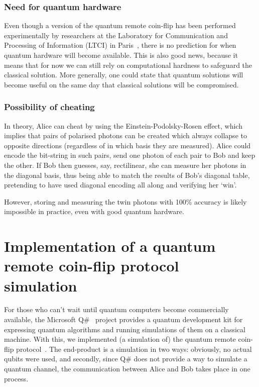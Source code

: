 \documentclass[oneside,a4paper]{article}
\begin{document}
\subsubsection{Need for quantum hardware} %
Even though a version of the quantum remote coin-flip has been performed experimentally by researchers at the Laboratory for Communication and Processing of Information (LTCI) in Paris~\cite{pappa2014experimental}, there is no prediction for when quantum hardware will become available.
This is also good news, because it means that for now we can still rely on computational hardness to safeguard the classical solution.
More generally, one could state that quantum solutions will become useful on the same day that classical solutions will be compromised.

\subsubsection{Possibility of cheating}
\label{sec:cheating-epr}
In theory, Alice can cheat by using the Einstein-Podolsky-Rosen effect, which implies that pairs of polarised photons can be created which always collapse to opposite directions (regardless of in which basis they are measured).
Alice could encode the bit-string in such pairs, send one photon of each pair to Bob and keep the other.
If Bob then guesses, say, rectilinear, she can measure her photons in the diagonal basis, thus being able to match the results of Bob's diagonal table, pretending to have used diagonal encoding all along and verifying her `win'.

However, storing and measuring the twin photons with 100\% accuracy is likely impossible in practice, even with good quantum hardware.

\section{Implementation of a quantum remote coin-flip protocol simulation}
For those who can't wait until quantum computers become commercially available, the Microsoft Q\#~\cite{qsharp} project provides a quantum development kit for expressing quantum algorithms and running simulations of them on a classical machine.
With this, we implemented (a simulation of) the quantum remote coin-flip protocol~\cite{quantum-coin-toss-repo}.
The end-product is a simulation in two ways: obviously, no actual qubits were used, and secondly, since Q\# does not provide a way to simulate a quantum channel, the communication between Alice and Bob takes place in one process.
\end{document}

